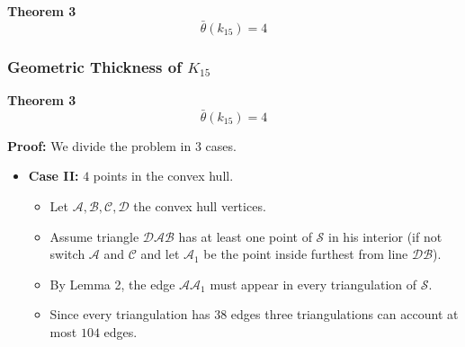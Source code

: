 \documentclass[12 pt]{beamer}
\begin{document}
\begin{frame}{}
    \frametitle{}
    
    \begin{block}{\textbf{Theorem 3}}
    $$\bar{\theta} (k_{15}) = 4 $$
    \end{block}
 
\end{frame} 

\begin{frame}{}
    \frametitle{Geometric Thickness of $K_{15}$}
    
    \begin{block}{\textbf{Theorem 3}}
    $$\bar{\theta} (k_{15}) = 4 $$
    \end{block}

    \textbf{Proof:}
    We divide the problem in $3$ cases.
    
    \begin{itemize}
    \item \textbf{Case II:} $4$ points in the convex hull. 
        \begin{itemize}
            \item Let $\mathcal{A, B, C, D}$ the convex hull vertices.
            \item Assume triangle $\mathcal{DAB}$ has at least one point of $\mathcal{S}$ in his interior (if not switch $\mathcal{A}$ and $\mathcal{C}$ and let $\mathcal{A}_{1}$ be the point inside furthest from line $\mathcal{DB}$).
            \item By Lemma 2, the edge $\mathcal{AA}_{1}$ must appear in every triangulation of $\mathcal{S}$.
            \item Since every triangulation has $38$ edges three triangulations can account at most $104$ edges.
        \end{itemize}
    \end{itemize}
\end{frame} 
\end{document}
